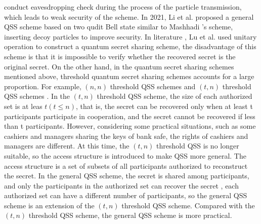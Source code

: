 \documentclass[pdflatex,sn-mathphys]{sn-jnl}%
\theoremstyle{thmstyleone}%
\theoremstyle{thmstyletwo}%
\theoremstyle{thmstylethree}%
\begin{document}
conduct eavesdropping check during the process of the particle transmission, which leads to weak security of the scheme. In 2021, Li et al. \cite{ref-ur23} proposed a general QSS scheme based on two qudit Bell state similar to Mashhadi \cite{ref-ur20}'s scheme, inserting decoy particles to improve security. In literature \cite{ref-ur24}, Lu et al. used unitary operation to construct a quantum secret sharing scheme, the disadvantage of this scheme is that it is impossible to verify whether the recovered secret is the original secret. On the other hand, in the quantum secret sharing schemes \cite{ref-ur12,ref-ur13,ref-ur14,ref-ur15,ref-ur16,ref-ur17,ref-ur18,ref-ur19,ref-ur20,ref-ur21} mentioned above, threshold quantum secret sharing schemes accounts for a large proportion. For example, $(n,n)$ threshold QSS schemes \cite{ref-ur15,ref-ur19} and $(t,n)$ threshold QSS schemes \cite{ref-ur12,ref-ur13,ref-ur14,ref-ur16,ref-ur17,ref-ur18}. In the $(t,n)$ threshold QSS scheme, the size of each authorized set is at leas $t(t \leq n)$, that is, the secret can be recovered only when at least t participants participate in cooperation, and the secret cannot be recovered if less than t participants. However, considering some practical situations, such as some cashiers and managers sharing the keys of bank safe, the rights of cashiers and managers are different. At this time, the $(t,n)$ threshold QSS is no longer suitable, so the access structure is introduced to make QSS more general. The access structure is a set of subsets of all participants authorized to reconstruct the secret. In the general QSS scheme, the secret is shared among participants, and only the participants in the authorized set can recover the secret \cite{ref-ur20,ref-ur21}, each authorized set can have a different number of participants, so the general QSS scheme is an extension of the $(t,n)$ threshold QSS scheme. Compared with the $(t,n)$ threshold QSS scheme, the general QSS scheme is more practical. \\ 
\end{document}
